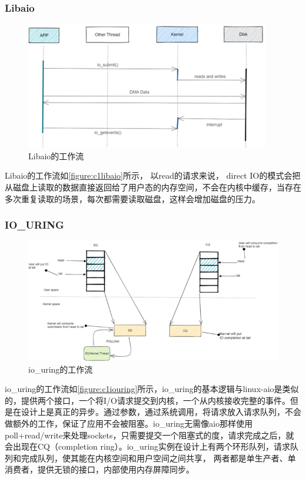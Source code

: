 \subsubsection{Libaio}
\begin{figure}[htb]
    \figureCapSet
    \centering
    \includegraphics[width=.8\linewidth]{figure/c1/libaio.png}
    \caption{Libaio的工作流}
    \label{figure:c1libaio}
\end{figure}

Libaio的工作流如\autoref{figure:c1libaio}所示， 以read的请求来说， direct IO的模式会把从磁盘上读取的数据直接返回给了用户态的内存空间，不会在内核中缓存，当存在多次重复读取的场景，每次都需要读取磁盘，这样会增加磁盘的压力。


\subsubsection{IO\_URING}
\begin{figure}[htb]
    \figureCapSet
    \centering
    \includegraphics[width=.8\linewidth]{figure/c1/iouring.png}
    \caption{io\_uring的工作流}
    \label{figure:c1iouring}
\end{figure}

io\_uring的工作流如\autoref{figure:c1iouring}所示，io\_uring的基本逻辑与linux-aio是类似的，提供两个接口，一个将I/O请求提交到内核，一个从内核接收完整的事件。但是在设计上是真正的异步。通过参数，通过系统调用，将请求放入请求队列，不会做额外的工作，保证了应用不会被阻塞。io\_uring无需像aio那样使用 poll+read/write来处理sockets，只需要提交一个阻塞式的度，请求完成之后，就会出现在CQ（completion ring）。io\_uring实例在设计上有两个环形队列，请求队列和完成队列，使其能在内核空间和用户空间之间共享， 两者都是单生产者、单消费者，提供无锁的接口，内部使用内存屏障同步。

